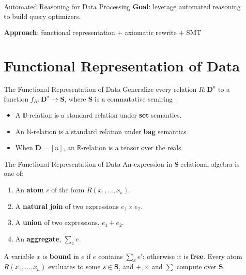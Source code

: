 \documentclass{beamer}
\newcommand{\B}{\mathbb B} %
\newcommand{\N}{\mathbb N} %
\newcommand{\R}{\mathbb R} %
\newcommand{\D}{\mathbf D} %
\newcommand{\SR}{\mathbf S} %
\begin{document}
  \begin{frame}{Automated Reasoning for Data Processing}
    \textbf{Goal}: leverage automated reasoning to build query optimizers.

    \textbf{Approach}: functional representation + axiomatic rewrite + SMT
  \end{frame}
  
  \section{Functional Representation of Data}
  \begin{frame}{The Functional Representation of Data}
    Generalize every relation $R : \D^a$ to a function 
    $f_R : \D^a \rightarrow \SR$,
    where $\SR$ is a commutative semiring~\cite{semiring}. \pause
    \begin{itemize}
      \item A $\B$-relation is a standard relation under \textbf{set} semantics. \pause
      \item An $\N$-relation is a standard relation under \textbf{bag} semantics. \pause
      \item When $\D = [n]$, an $\R$-relation is a tensor over the reals.
    \end{itemize}
  \end{frame}

  \begin{frame}{The Functional Representation of Data}
    An expression in $\SR$-relational algebra is one of:
    \begin{enumerate}
      \item An \textbf{atom} $r$ of the form $R(x_1, ..., x_a)$.
      \item A \textbf{natural join} of two expressions $e_1 \times e_2$.
      \item A \textbf{union} of two expressions, $e_1 + e_2$.
      \item An \textbf{aggregate},  $\sum_x e$.
    \end{enumerate} \pause
    A variable $x$ is \textbf{bound} in $e$ if $e$ contains $\sum_x e'$;
    otherwise it is \textbf{free}. \pause 
    Every atom $R(x_1, ..., x_a)$ evaluates to some $s \in \SR$, and
    $+, \times$ and $\sum$ compute over $\SR$.
  \end{frame}
\end{document}
